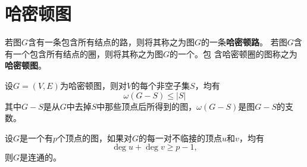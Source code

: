 \chapter{哈密顿图}

若图$G$含有一条包含所有结点的路，则将其称之为图$G$的一条{\bfseries 哈密顿路}。
若图$G$含有一个包含所有结点的圈，则将其称之为图$G$的一个{}。包
含哈密顿圈的图称之为{\bfseries 哈密顿图}。

\begin{Ex}
      设$G=(V,E)$为哈密顿图，则对$V$的每个非空子集$S$，均有
    \[\omega(G-S) \leq |S|\]
    其中$G-S$是从$G$中去掉$S$中那些顶点后所得到的图，$\omega(G-S)$是图$G-S$的支数。
  \end{Ex}

  \begin{Ex}
        设$G$是一个有$p$个顶点的图，如果对$G$的每一对不临接的顶点$u$和$v$，均有
    \begin{equation*}
      \deg u + \deg v \geq p - 1,
    \end{equation*}
则$G$是连通的。

  \end{Ex}

